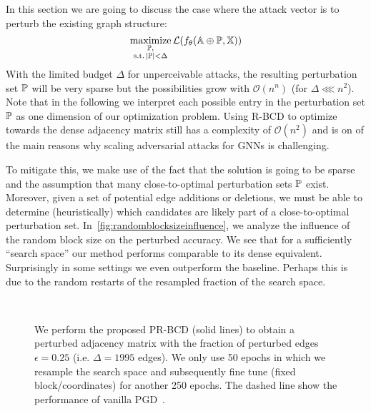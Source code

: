 \documentclass{article} %
\newcommand{\featset}{\sX}
\DeclareMathOperator*{\maximize}{maximize}
\begin{document}
In this section we are going to discuss the case where the attack vector is to perturb the existing graph structure:
%
\begin{equation}\label{eq:pgd}
    \maximize_{\substack{\sP,\\\text{s.t.}\, |\sP| < \Delta}} \mathcal{L}(f_{\theta}(\sA \oplus \sP, \featset))
\end{equation}
%
With the limited budget \(\Delta\) for unperceivable attacks, the resulting perturbation set \({\mathbb{P}}\) will be very sparse but the possibilities grow with \(\mathcal{O}(n^n)\) (for \(\Delta \lll n^2\)).  %
Note that in the following we interpret each possible entry in the perturbation set \({\mathbb{P}}\) as one dimension of our optimization problem. Using R-BCD to optimize towards the dense adjacency matrix still has a complexity of \(\mathcal{O}(n^2)\) and is on of the main reasons why scaling adversarial attacks for GNNs is challenging.

To mitigate this, we make use of the fact that the solution is going to be sparse and the assumption that many close-to-optimal perturbation sets \({\mathbb{P}}\) exist. Moreover, given a set of potential edge additions or deletions, we must be able to determine (heuristically) which candidates are likely part of a close-to-optimal perturbation set. In~\autoref{fig:randomblocksizeinfluence}, we analyze the influence of the random block size on the perturbed accuracy. We see that for a sufficiently ``search space'' our method performs comparable to its dense equivalent. Surprisingly in some settings we even outperform the baseline. Perhaps this is due to the random restarts of the resampled fraction of the search space.

\begin{wrapfigure}[26]{r}{.4\textwidth}
  \centering
  \vspace{-15pt}
  \hbox{%
  \resizebox{1\linewidth}{!}{}
  }
  \resizebox{1\linewidth}{!}{
     
  }
  \caption{We perform the proposed PR-BCD (solid lines) to obtain a perturbed adjacency matrix with the fraction of perturbed edges \(\epsilon=0.25\) (i.e. \(\Delta=1995\) edges). We only use 50 epochs in which we resample the search space and subsequently fine tune (fixed block/coordinates) for another 250 epochs. The dashed line show the performance of vanilla PGD~\citep{Xu2019a}.\label{fig:randomblocksizeinfluence}}
\end{wrapfigure}
\end{document}
